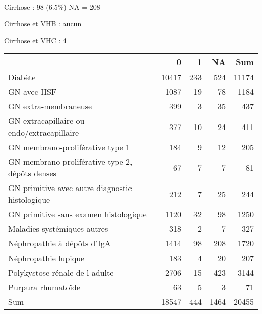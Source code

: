 \documentclass[11pt,a4paper]{article}\usepackage[]{graphicx}\usepackage[]{color}
\begin{document}
~\\

Cirrhose : 98 (6.5\%) NA = 208

Cirrhose et VHB : aucun

Cirrhose et VHC : 4

\begin{table}[H]
\centering
\begin{tabular}{lrrrr}
  \hline
 & 0 & 1 & NA & Sum \\ 
  \hline
Diabète & 10417 & 233 & 524 & 11174 \\ 
  GN avec HSF & 1087 & 19 & 78 & 1184 \\ 
  GN extra-membraneuse & 399 & 3 & 35 & 437 \\ 
  GN extracapillaire ou endo/extracapillaire & 377 & 10 & 24 & 411 \\ 
  GN membrano-proliférative type 1 & 184 & 9 & 12 & 205 \\ 
  GN membrano-proliférative type 2, dépôts denses & 67 & 7 & 7 & 81 \\ 
  GN primitive avec autre diagnostic histologique & 212 & 7 & 25 & 244 \\ 
  GN primitive sans examen histologique & 1120 & 32 & 98 & 1250 \\ 
  Maladies systémiques autres & 318 & 2 & 7 & 327 \\ 
  Néphropathie à dépôts d'IgA & 1414 & 98 & 208 & 1720 \\ 
  Néphropathie lupique & 183 & 4 & 20 & 207 \\ 
  Polykystose rénale de l adulte & 2706 & 15 & 423 & 3144 \\ 
  Purpura rhumatoïde & 63 & 5 & 3 & 71 \\ 
  Sum & 18547 & 444 & 1464 & 20455 \\ 
   \hline
\end{tabular}
\end{table}
\end{document}
